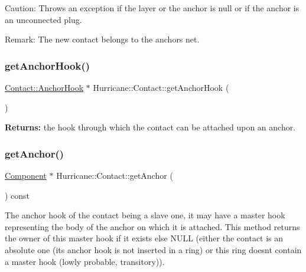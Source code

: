 \begin{DoxyParagraph}{Caution\+: Throws an exception if the layer or the anchor is null or if }
the anchor is an unconnected plug.
\end{DoxyParagraph}
\begin{DoxyParagraph}{Remark\+: The new contact belongs to the anchor\textquotesingle{}s net. }

\end{DoxyParagraph}
\mbox{\label{classHurricane_1_1Contact_a300306b006397377bc9a54ea783c1150}} 
\subsubsection{\texorpdfstring{get\+Anchor\+Hook()}{getAnchorHook()}}
{\footnotesize\ttfamily \mbox{\hyperlink{classHurricane_1_1Contact_1_1AnchorHook}{Contact\+::\+Anchor\+Hook}} $\ast$ Hurricane\+::\+Contact\+::get\+Anchor\+Hook (\begin{DoxyParamCaption}{ }\end{DoxyParamCaption})\hspace{0.3cm}{\ttfamily [inline]}}

{\bfseries Returns\+:} the hook through which the contact can be attached upon an anchor. \mbox{\label{classHurricane_1_1Contact_ab0b327b306bf7ebda634f59d8d0cfd8f}} 
\subsubsection{\texorpdfstring{get\+Anchor()}{getAnchor()}}
{\footnotesize\ttfamily \mbox{\hyperlink{classHurricane_1_1Component}{Component}} $\ast$ Hurricane\+::\+Contact\+::get\+Anchor (\begin{DoxyParamCaption}{ }\end{DoxyParamCaption}) const}

The anchor hook of the contact being a slave one, it may have a master hook representing the body of the anchor on which it is attached. This method returns the owner of this master hook if it exists else N\+U\+LL (either the contact is an absolute one (its anchor hook is not inserted in a ring) or this ring doesn\textquotesingle{}t contain a master hook (lowly probable, transitory)). \mbox{\label{classHurricane_1_1Contact_acf8405f74b97239ea74ec629d0b4e194}} 
